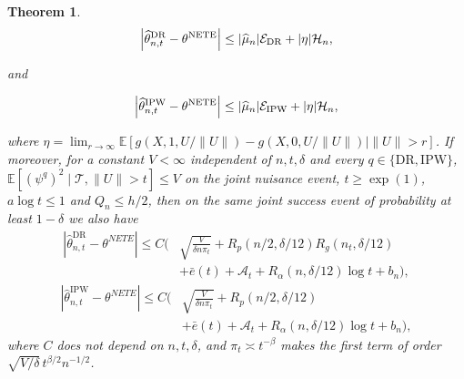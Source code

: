 \documentclass[12pt]{article}
\theoremstyle{plain}
\newtheorem{theorem}{Theorem}[section]
\theoremstyle{definition}
\begin{document}
\begin{theorem}
\[
\left|\widehat\theta_{n,t}^{\mathrm{DR}}-\theta^{\operatorname{NETE}}\right|
\leq |\widehat\mu_n|\mathcal E_{\mathrm{DR}}+|\eta|\mathcal H_n,
\]

and

\[
\left|\widehat\theta_{n,t}^{\mathrm{IPW}}-\theta^{\operatorname{NETE}}\right|
\leq |\widehat\mu_n|\mathcal E_{\mathrm{IPW}}+|\eta|\mathcal H_n,
\]

where $\eta=\lim_{r\rightarrow\infty}\mathbb E[g(X,1,U/\|U\|)-g(X,0,U/\|U\|)\mid\|U\|>r]$. If moreover, for a constant $V<\infty$ independent of $n,t,\delta$ and every $q\in\{\mathrm{DR},\mathrm{IPW}\}$, $\mathbb E[(\psi^q)^2\mid\mathcal T,\|U\|>t]\leq V$ on the joint nuisance event, $t\geq\exp(1)$, $a\log t\leq1$ and $Q_n\leq h/2$, then on the same joint success event of probability at least $1-\delta$ we also have
\begin{equation}
\label{eq:rate_dr}
\begin{aligned}
|\widehat\theta_{n,t}^{\mathrm{DR}}-\theta^{NETE}|\leq C\biggl(&\sqrt{\frac{V}{\delta n\pi_t}}+R_p(n/2,\delta/12)R_g(n_t,\delta/12)\\
&+\bar e(t)+\mathcal A_t+R_\alpha(n,\delta/12)\log t+b_n\biggr),
\end{aligned}
\end{equation}
\begin{equation}
\label{eq:rate_ipw}
\begin{aligned}
|\widehat\theta_{n,t}^{\mathrm{IPW}}-\theta^{NETE}|\leq C\biggl(&\sqrt{\frac{V}{\delta n\pi_t}}+R_p(n/2,\delta/12)\\
&+\bar e(t)+\mathcal A_t+R_\alpha(n,\delta/12)\log t+b_n\biggr),
\end{aligned}
\end{equation}
where $C$ does not depend on $n,t,\delta$, and $\pi_t\asymp t^{-\beta}$ makes the first term of order $\sqrt{V/\delta}\,t^{\beta/2}n^{-1/2}$.
\end{theorem}
\end{document}
